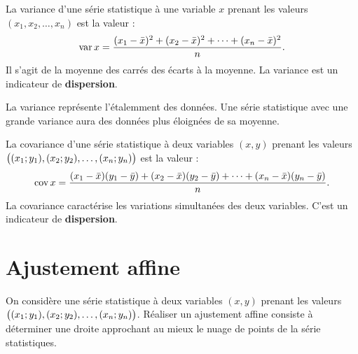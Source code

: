 \documentclass[a4paper, 12pt]{report}
\begin{document}
\begin{defn}[Variance]
La variance d'une série statistique à une variable $x$ prenant les valeurs $(x_1, x_2, \dots, x_n)$ est la valeur :
\[ \operatorname{var}{x} = \dfrac{(x_1-\bar{x})^2 + (x_2-\bar{x})^2 + \dots + (x_n-\bar{x})^2}{n} . \]
Il s'agit de la moyenne des carrés des écarts à la moyenne. La variance est un indicateur de \textbf{dispersion}.
\end{defn}

\begin{rmq}
La variance représente \og l'étalemment \fg{} des données. 
Une série statistique avec une grande variance aura des données plus éloignées de sa moyenne.
\end{rmq}

\begin{defn}[Covariance]
La covariance d'une série statistique à deux variables $(x,y)$ prenant les valeurs $\bigl( (x_1; y_1), (x_2; y_2), \dots, (x_n;y_n) \bigr)$ 
est la valeur :
\[ \operatorname{cov}{x} = \dfrac{(x_1-\bar{x})(y_1-\bar{y}) + (x_2-\bar{x})(y_2-\bar{y}) + \dots + (x_n-\bar{x})(y_n-\bar{y})}{n} . \]
La covariance caractérise les variations simultanées des deux variables. C'est un indicateur de \textbf{dispersion}.
\end{defn}

\section{Ajustement affine}

\begin{defn}
On considère une série statistique à deux variables $(x,y)$ prenant les valeurs $\bigl( (x_1; y_1), (x_2; y_2), \dots, (x_n;y_n) \bigr)$.
Réaliser un ajustement affine consiste à déterminer une droite approchant au mieux le nuage de points de la série statistiques.
\begin{center}
\end{center}
\end{defn}
\end{document}
